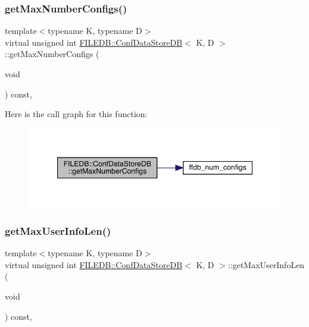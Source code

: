 \subsubsection{\texorpdfstring{getMaxNumberConfigs()}{getMaxNumberConfigs()}\hspace{0.1cm}{\footnotesize\ttfamily [3/3]}}
{\footnotesize\ttfamily template$<$typename K, typename D$>$ \\
virtual unsigned int \mbox{\hyperlink{classFILEDB_1_1ConfDataStoreDB}{F\+I\+L\+E\+D\+B\+::\+Conf\+Data\+Store\+DB}}$<$ K, D $>$\+::get\+Max\+Number\+Configs (\begin{DoxyParamCaption}\item[{void}]{ }\end{DoxyParamCaption}) const\hspace{0.3cm}{\ttfamily [inline]}, {\ttfamily [virtual]}}

Here is the call graph for this function\+:
\nopagebreak
\begin{figure}[H]
\begin{center}
\leavevmode
\includegraphics[width=347pt]{d8/d19/classFILEDB_1_1ConfDataStoreDB_a89337b5034d8f87b4a37ceb05ea99d3a_cgraph}
\end{center}
\end{figure}
\mbox{\label{classFILEDB_1_1ConfDataStoreDB_a0fc37111156b6c7080ff6a6831c847fc}} 
\subsubsection{\texorpdfstring{getMaxUserInfoLen()}{getMaxUserInfoLen()}\hspace{0.1cm}{\footnotesize\ttfamily [1/3]}}
{\footnotesize\ttfamily template$<$typename K, typename D$>$ \\
virtual unsigned int \mbox{\hyperlink{classFILEDB_1_1ConfDataStoreDB}{F\+I\+L\+E\+D\+B\+::\+Conf\+Data\+Store\+DB}}$<$ K, D $>$\+::get\+Max\+User\+Info\+Len (\begin{DoxyParamCaption}\item[{void}]{ }\end{DoxyParamCaption}) const\hspace{0.3cm}{\ttfamily [inline]}, {\ttfamily [virtual]}}

